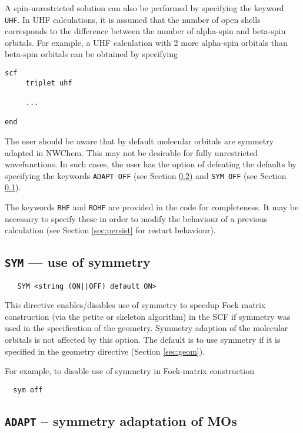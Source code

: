 A spin-unrestricted solution can also be performed by specifying the
keyword \verb+UHF+.  In UHF calculations, it is assumed that the
number of open shells corresponds to the difference between the number
of alpha-spin and beta-spin orbitals.  For example, a UHF calculation
with 2 more alpha-spin orbitals than beta-spin orbitals can be
obtained by specifying

\begin{verbatim}
scf
     triplet uhf

     ...

end
\end{verbatim}

The user should be aware that by default molecular orbitals are
symmetry adapted in NWChem.  This may not be desirable for fully
unrestricted wavefunctions.  In such cases, the user has the option of
defeating the defaults by specifying the keywords \verb+ADAPT OFF+
(see Section \ref{sec:adapt}) and \verb+SYM OFF+ (see Section
\ref{sec:sym}).

The keywords \verb+RHF+ and \verb+ROHF+ are provided in the code for
completeness. It may be necessary to specify these in order to modify
the behaviour of a previous calculation (see Section \ref{sec:persist}
  for restart behaviour).

\subsection{{\tt SYM} --- use of symmetry}
\label{sec:sym}

 \begin{verbatim}
   SYM <string (ON||OFF) default ON>
 \end{verbatim}

This directive enables/disables use of symmetry to speedup Fock matrix
construction (via the petite or skeleton algorithm) in the SCF if
symmetry was used in the specification of the geometry.  Symmetry
adaption of the molecular orbitals is not affected by this option.
The default is to use symmetry if it is specified in the geometry
directive (Section \ref{sec:geom}). 

For example, to disable use of symmetry in Fock-matrix construction
\begin{verbatim}
  sym off
\end{verbatim}

\subsection{{\tt ADAPT} -- symmetry adaptation of MOs}
\label{sec:adapt}

